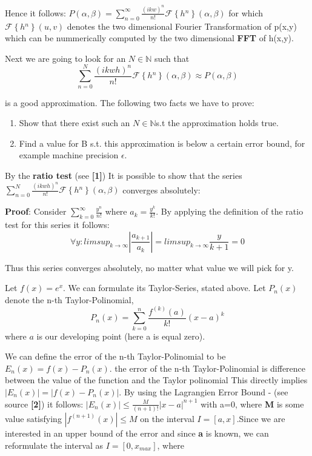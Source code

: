 Hence it follows: $P(\alpha,\beta)=\sum_{n=0}^{\infty}\frac{(ikw)^{n}}{n!}\mathcal{F}\left\{ h{}^{n}\right\} (\alpha,\beta)$ for which $\mathcal{F}\left\{ h{}^{n}\right\} (u,v)$ denotes the two dimensional Fourier Transformation of p(x,y) which can be nummerically computed by the two dimensional \textbf{FFT} of h(x,y). 



Next we are going to look for an $N\mathbb{\in N}$ such that 
\begin{equation*}
 \sum_{n=0}^{N}\frac{(ikwh)^{n}}{n!}\mathcal{F}\left\{ h{}^{n}\right\} (\alpha,\beta) \approx P(\alpha,\beta) 
\end{equation*}

is a good approximation. The following two facts we have to prove:
\begin{enumerate}
\item Show that there exist such an $N\mathbb{\in N}$s.t the approximation
holds true.
\item Find a value for B s.t. this approximation is below a certain error
bound, for example machine precision $\epsilon$. 
\end{enumerate}


By the \textbf{ratio test} (see \textbf{{[}1{]}}) 
It is possible to show that the series $\sum_{n=0}^{N}\frac{(ikwh)^{n}}{n!}\mathcal{F}\left\{ h{}^{n}\right\} (\alpha,\beta)$ converges absolutely:

\textbf{Proof}: Consider $\sum_{k=0}^{\infty}\frac{y^{n}}{n!}$ where
$a_{k}=\frac{y^{k}}{k!}$. By applying the definition of the ratio test for this series it follows: 
\begin{equation*}
 \forall y:limsup_{k\rightarrow\infty}|\frac{a_{k+1}}{a_{k}}|=limsup_{k\rightarrow\infty}\frac{y}{k+1}=0 
\end{equation*}

Thus this series converges absolutely, no matter what value we will
pick for y.

Let $f(x)=e^{x}$. We can formulate its Taylor-Series, stated above.
Let $P_{n}(x)$denote the n-th Taylor-Polinomial, 
\begin{equation*}
 P_{n}(x)=\sum_{k=0}^{n}\frac{f^{(k)}(a)}{k!}(x-a)^{k}
\end{equation*}
where $a$ is our developing point (here a is equal zero). 

We can define the error of the n-th Taylor-Polinomial to be $E_{n}(x)=f(x)-P_{n}(x)$.
the error of the n-th Taylor-Polinomial is difference between the value of the function and the Taylor polinomial
This directly implies $|E_{n}(x)|=|f(x)-P_{n}(x)|$. By using the Lagrangien Error Bound - (see source \textbf{{[}2{]}}) it follows: $|E_{n}(x)|\leq\frac{M}{(n+1)!}|x-a|^{n+1}$ with a=0, where \textbf{M }is some value satisfying $|f^{(n+1)}(x)|\leq M$
on the interval $I=[a,x]$.Since we are interested in an upper bound of the error and since \textbf{a} is known, we can reformulate the interval as $I=[0,x_{max}]$, where 

